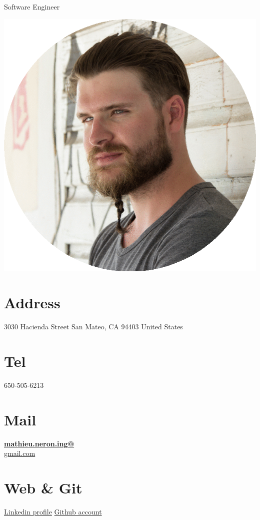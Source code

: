 \documentclass[]{friggeri-cv}
\begin{document}
      {Software Engineer}
      

\begin{aside}
  \includegraphics[scale=0.18]{img/mathieu.png}
  \section{Address}
    3030 Hacienda Street
    San Mateo, CA
    94403
    United States
    ~
  \section{Tel}
    650-505-6213
    ~
  \section{Mail}
    \href{mailto:mathieu.neron.ing@gmail.com}{\textbf{mathieu.neron.ing@}\\gmail.com}
    ~
  \section{Web \& Git}
    \href{https://ca.linkedin.com/in/mathieu-n\%C3\%A9ron-b4419522}{Linkedin profile}
\href{https://github.com/mathieu-neron}{Github account}
    ~

\end{aside}
\end{document}
